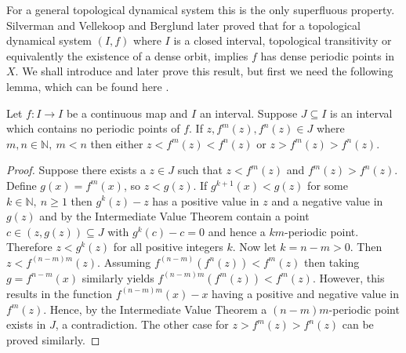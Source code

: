 For a general topological dynamical system this is the only superfluous property. Silverman \cite{silverman} and Vellekoop and Berglund \cite{vellekoop-berglund} later proved that for a topological dynamical system $(I, f)$ where $I$ is a closed interval, topological transitivity or equivalently the existence of a dense orbit, implies $f$ has dense periodic points in $X$. We shall introduce and later prove this result, but first we need the following lemma, which can be found here \cite[\S 4.1]{block-coppel}.

\begin{lem} \label{lem:closed-interval-no-periodic-points}
    Let $f: I \to I$ be a continuous map and $I$ an interval. Suppose $J \subseteq I$ is an interval which contains no periodic points of $f$. If $z, f^m(z), f^n(z) \in J$ where $m, n \in \mathbb{N}, \ m < n$ then either $z < f^m(z) < f^n(z)$ or $z > f^m(z) > f^n(z)$.
    \begin{proof}
        Suppose there exists a $z \in J$ such that $z < f^m(z)$ and $f^m(z) > f^n(z)$. Define $g(x) = f^m(x)$, so $z < g(z)$. If $g^{k+1}(x) < g(z)$ for some $k \in \mathbb{N}, \ n \geq 1$ then $g^k(z) - z$ has a positive value in $z$ and a negative value in $g(z)$ and by the Intermediate Value Theorem contain a point $c \in (z, g(z)) \subseteq J$ with $g^k(c) - c = 0$ and hence a $km$-periodic point. Therefore $z < g^k(z)$ for all positive integers $k$. Now let $k = n - m > 0$. Then $z < f^{(n - m)m}(z)$. Assuming $f^{(n-m)}(f^n(z)) < f^m(z)$ then taking $g = f^{n-m}(x)$ similarly yields $f^{(n-m)m}(f^m(z)) < f^m(z)$. However, this results in the function $f^{(n-m)m}(x) - x$ having a positive and negative value in $f^m(z)$. Hence, by the Intermediate Value Theorem a $(n-m)m$-periodic point exists in $J$, a contradiction. The other case for $z > f^m(z) > f^n(z)$ can be proved similarly.
    \end{proof}
\end{lem}

